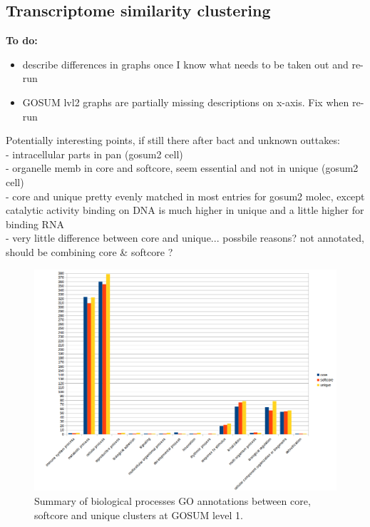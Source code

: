\documentclass[12pt]{article}
\begin{document}
\subsection*{Transcriptome similarity clustering}
\FloatBarrier
\textbf{To do:}
\begin{itemize}
\item describe differences in graphs once I know what needs to be taken out and re-run
\item GOSUM lvl2 graphs are partially missing descriptions on x-axis. Fix when re-run
\end{itemize}
Potentially interesting points, if still there after bact and unknown outtakes:\\
- intracellular parts in pan (gosum2 cell)\\
- organelle memb in core and softcore, seem essential and not in unique (gosum2 cell)\\
- core and unique pretty evenly matched in most entries for gosum2 molec, except catalytic activity binding on DNA is  much higher in unique and a little higher for binding RNA\\
- very little difference between core and unique... possbile reasons? not annotated, should be combining core \& softcore ?

\FloatBarrier
\begin{figure} 
\includegraphics[scale=.58]{3Aug18_cluster-investigation/figures/gosum-pan/Pan-gosum1-bio-graph.png} 
\caption{Summary of biological processes GO annotations between core, softcore and unique clusters at GOSUM level 1.} 
\label{fig:PanGo1Bio}
\end{figure} 
\FloatBarrier
\end{document}
